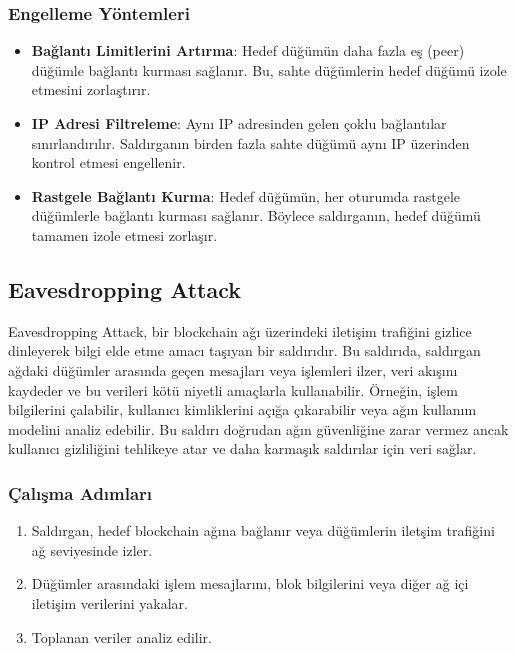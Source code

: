 \subsubsection{Engelleme Yöntemleri}

\begin{itemize}
    \item \textbf{Bağlantı Limitlerini Artırma}: Hedef düğümün daha fazla eş (peer) düğümle bağlantı kurması sağlanır. Bu, sahte düğümlerin hedef düğümü izole etmesini zorlaştırır.
    \item \textbf{IP Adresi Filtreleme}: Aynı IP adresinden gelen çoklu bağlantılar sınırlandırılır. Saldırganın birden fazla sahte düğümü aynı IP üzerinden kontrol etmesi engellenir.
    \item \textbf{Rastgele Bağlantı Kurma}: Hedef düğümün, her oturumda rastgele düğümlerle bağlantı kurması sağlanır. Böylece saldırganın, hedef düğümü tamamen izole etmesi zorlaşır.
\end{itemize}

\newpage

\subsection{Eavesdropping Attack}

Eavesdropping Attack, bir blockchain ağı üzerindeki iletişim trafiğini gizlice dinleyerek bilgi elde etme amacı taşıyan bir saldırıdır. Bu saldırıda, saldırgan ağdaki düğümler arasında geçen mesajları veya işlemleri ilzer, veri akışını kaydeder ve bu verileri kötü niyetli amaçlarla kullanabilir. Örneğin, işlem bilgilerini çalabilir, kullanıcı kimliklerini açığa çıkarabilir veya ağın kullanım modelini analiz edebilir. Bu saldırı doğrudan ağın güvenliğine zarar vermez ancak kullanıcı gizliliğini tehlikeye atar ve daha karmaşık saldırılar için veri sağlar.

\subsubsection{Çalışma Adımları}

\begin{enumerate}
    \item Saldırgan, hedef blockchain ağına bağlanır veya düğümlerin iletşim trafiğini ağ seviyesinde izler.
    \item Düğümler arasındaki işlem mesajlarını, blok bilgilerini veya diğer ağ içi iletişim verilerini yakalar.
    \item Toplanan veriler analiz edilir. 
\end{enumerate}

